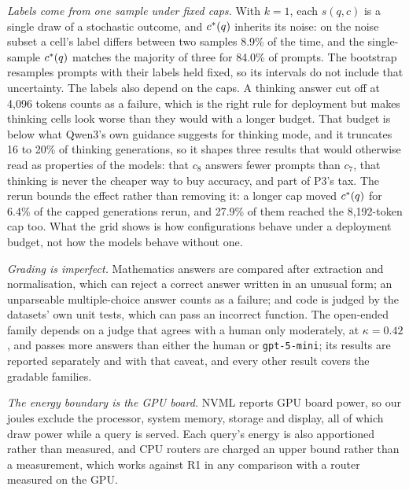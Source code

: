 \emph{Labels come from one sample under fixed caps.} With $k = 1$, each
$s(q, c)$ is a single draw of a stochastic outcome, and $c^{*}(q)$ inherits
its noise: on the noise subset a cell's label differs between two samples
8.9\% of the time, and the single-sample $c^{*}(q)$ matches the majority of
three for 84.0\% of prompts. The bootstrap resamples prompts with their
labels held fixed, so its intervals do not include that uncertainty. The
labels also depend on the caps. A thinking answer cut off at 4{,}096 tokens
counts as a failure, which is the right rule for deployment but makes
thinking cells look worse than they would with a longer budget. That budget
is below what Qwen3's own guidance suggests for thinking mode, and it
truncates 16 to 20\% of thinking generations, so it shapes three results that
would otherwise read as properties of the models: that $c_8$ answers fewer
prompts than $c_7$, that thinking is never the cheaper way to buy accuracy,
and part of P3's tax. The rerun bounds the effect rather than removing it: a
longer cap moved $c^{*}(q)$ for 6.4\% of the capped generations rerun, and
27.9\% of them reached the 8{,}192-token cap too. What the grid shows is how
configurations behave under a deployment budget, not how the models behave
without one.

\emph{Grading is imperfect.} Mathematics answers are compared after
extraction and normalisation, which can reject a correct answer written in an
unusual form; an unparseable multiple-choice answer counts as a failure; and
code is judged by the datasets' own unit tests, which can pass an incorrect
function. The open-ended family depends on a judge that agrees with a human
only moderately, at $\kappa = 0.42$, and passes more answers than either the
human or \texttt{gpt-5-mini}; its results are reported separately and with
that caveat, and every other result covers the gradable families.

\emph{The energy boundary is the GPU board.} NVML reports GPU board power, so
our joules exclude the processor, system memory, storage and display, all of
which draw power while a query is served. Each query's energy is also
apportioned rather than measured, and CPU routers are charged an upper bound
rather than a measurement, which works against R1 in any comparison with a
router measured on the GPU.

